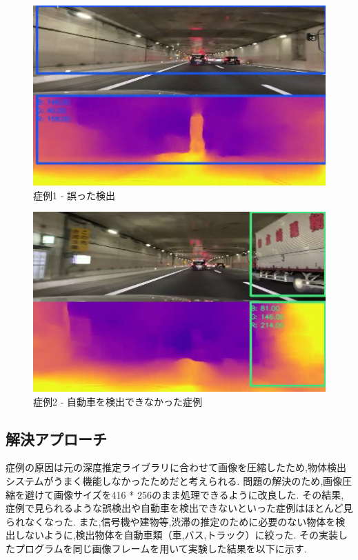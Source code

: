 \newpage
\begin{figure}[htbp]
  \begin{center}
   \includegraphics[width=12cm]{figs/miss_1.png}
  \end{center}
  \caption{症例1 - 誤った検出}
  \label{fig:miss1}
\end{figure}

\begin{figure}[hbtp]
 \begin{center}
  \includegraphics[width=12cm]{figs/miss_2.png}
 \end{center}
  \caption{症例2 - 自動車を検出できなかった症例}
  \label{fig:miss2}
\end{figure}


\subsection{解決アプローチ}
症例の原因は元の深度推定ライブラリに合わせて画像を圧縮したため,物体検出システムがうまく機能しなかったためだと考えられる.
問題の解決のため,画像圧縮を避けて画像サイズを416 * 256のまま処理できるように改良した.
その結果,症例で見られるような誤検出や自動車を検出できないといった症例はほとんど見られなくなった.
また,信号機や建物等,渋滞の推定のために必要のない物体を検出しないように,検出物体を自動車類（車,バス,トラック）に絞った.
その実装したプログラムを同じ画像フレームを用いて実験した結果を以下に示す.

